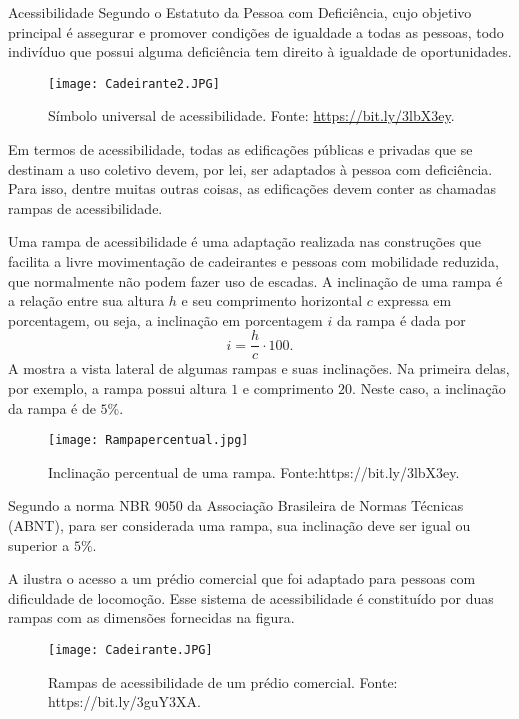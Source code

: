 \begin{task}{Acessibilidade}
Segundo o Estatuto da Pessoa com Deficiência, cujo objetivo principal é assegurar e promover condições de igualdade a todas as pessoas, todo indivíduo que possui alguma deficiência tem direito à igualdade de oportunidades. 

\begin{figure}[H]
    \centering
    \texttt{[image: Cadeirante2.JPG]}
    \caption{Símbolo universal de acessibilidade. Fonte: \url{https://bit.ly/3lbX3ey}.}
    \label{Cadeirante2}
\end{figure}


Em termos de acessibilidade, todas as edificações públicas e privadas que se destinam a uso coletivo devem, por lei, ser adaptados à pessoa com deficiência. Para isso, dentre muitas outras coisas, as edificações devem conter as chamadas rampas de acessibilidade. 

Uma rampa de acessibilidade é uma adaptação realizada nas construções que facilita a livre movimentação de cadeirantes e pessoas com mobilidade reduzida, que normalmente não podem fazer uso de escadas. A inclinação de uma rampa é a relação entre sua altura $h$ e seu comprimento horizontal $c$ expressa em porcentagem, ou seja, a inclinação em porcentagem $i$ da rampa é dada por 
$$i=\frac{h}{c}\cdot 100.$$
A  mostra a vista lateral de algumas rampas e suas inclinações. Na primeira delas, por exemplo, a rampa possui altura $1$ e comprimento $20$. Neste caso, a inclinação da rampa é de $5\%$.

\begin{figure}[H]
    \centering
    \texttt{[image: Rampapercentual.jpg]}
    \caption{Inclinação percentual de uma rampa. Fonte:https://bit.ly/3lbX3ey.}
    \label{Rampapercentual}
\end{figure}



Segundo a norma NBR 9050 da Associação Brasileira de Normas Técnicas (ABNT), para ser considerada uma rampa, sua inclinação deve ser igual ou superior a $5\%$. 

A  ilustra  o acesso a um prédio comercial que foi adaptado para pessoas com dificuldade de locomoção. Esse sistema de acessibilidade é constituído por duas rampas com as dimensões fornecidas na figura.

\begin{figure}[H]
    \centering
    \texttt{[image: Cadeirante.JPG]}
    \caption{Rampas de acessibilidade de um prédio comercial. Fonte: https://bit.ly/3guY3XA.}
    \label{Cadeirante}
\end{figure}



\end{task}
